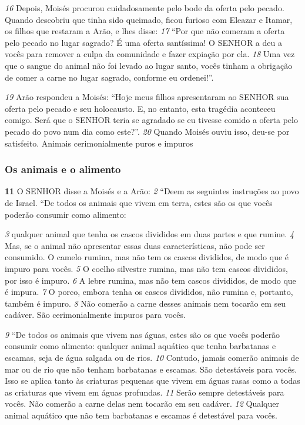 \smallskip 
\textit{\tiny 16}
Depois, Moisés procurou cuidadosamente pelo bode da oferta pelo pecado.
Quando descobriu que tinha sido queimado, ficou furioso com Eleazar e Itamar,
os filhos que restaram a Arão, e lhes disse: 
\textit{\tiny 17}
“Por que não comeram a oferta pelo
pecado no lugar sagrado? É uma oferta santíssima! O SENHOR a deu a vocês para
remover a culpa da comunidade e fazer expiação por ela. 
\textit{\tiny 18}
Uma vez que o sangue
do animal não foi levado ao lugar santo, vocês tinham a obrigação de comer a
carne no lugar sagrado, conforme eu ordenei!”.

\smallskip 
\textit{\tiny 19}
Arão respondeu a Moisés: “Hoje meus filhos apresentaram ao SENHOR sua
oferta pelo pecado e seu holocausto. E, no entanto, esta tragédia aconteceu
comigo. Será que o SENHOR teria se agradado se eu tivesse comido a oferta pelo
pecado do povo num dia como este?”. 
\textit{\tiny 20}
Quando Moisés ouviu isso, deu-se por
satisfeito.
Animais cerimonialmente puros e impuros
   
\bigskip
\subsubsection*{Os animais e o alimento}
\textbf{\large 11}
 O SENHOR disse a Moisés e a Arão: 
\textit{\tiny 2} 
“Deem as seguintes instruções ao povo
de Israel.
  “De todos os animais que vivem em terra,
 estes são os que vocês poderão
consumir como alimento: 

\smallskip 
\textit{\tiny 3} 
qualquer animal que tenha os cascos divididos em
duas partes e que rumine. 
\textit{\tiny 4} 
Mas, se o animal não apresentar essas duas
características, não pode ser consumido. O camelo rumina, mas não tem os cascos
divididos, de modo que é impuro para vocês. 
\textit{\tiny 5} 
O coelho silvestre
 rumina, mas
não tem cascos divididos, por isso é impuro. 
\textit{\tiny 6} 
A lebre rumina, mas não tem cascos
divididos, de modo que é impura. 
\textit{\tiny 7} 
O porco, embora tenha os cascos divididos,
não rumina e, portanto, também é impuro. 
\textit{\tiny 8} 
Não comerão a carne desses animais
nem tocarão em seu cadáver. São cerimonialmente impuros para vocês. 

\smallskip 
\textit{\tiny 9} 
“De todos os animais que vivem nas águas, estes são os que vocês poderão
consumir como alimento: qualquer animal aquático que tenha barbatanas e
escamas, seja de água salgada ou de rios. 
\textit{\tiny 10}
Contudo, jamais comerão animais de
mar ou de rio que não tenham barbatanas e escamas. São detestáveis para vocês.
Isso se aplica tanto às criaturas pequenas que vivem em águas rasas como a todas
as criaturas que vivem em águas profundas. 
\textit{\tiny 11}
Serão sempre detestáveis para
vocês. Não comerão a carne delas nem tocarão em seu cadáver. 
\textit{\tiny 12}
Qualquer
animal aquático que não tem barbatanas e escamas é detestável para vocês.

